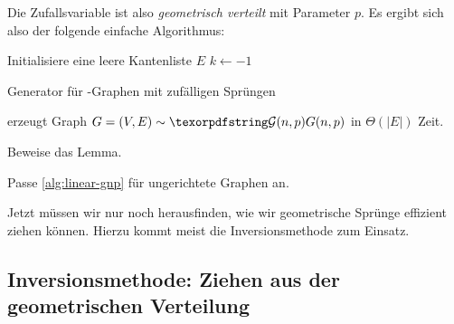 \noindent Die Zufallsvariable ist also \emph{geometrisch verteilt} mit Parameter $p$.
Es ergibt sich also der folgende einfache Algorithmus:

\begin{algorithm}[H]
    Initialisiere eine leere Kantenliste $E$\;
    $k \gets -1$\;
    \caption{Generator für \Gnp-Graphen mit zufälligen Sprüngen}
    \label{alg:linear-gnp}
\end{algorithm}

\begin{lemma}
    \label{lem:linear-gnp}
     erzeugt Graph $G = (V, E) \follows \Gnp$ in $\Theta(|E|)$ Zeit.
\end{lemma}

\begin{exercise}
    Beweise das Lemma.
\end{exercise}
\begin{exercise}
    Passe \cref{alg:linear-gnp} für ungerichtete Graphen an.
\end{exercise}

Jetzt müssen wir nur noch herausfinden, wie wir geometrische Sprünge effizient ziehen können.
Hierzu kommt meist die Inversionsmethode zum Einsatz.

\subsection{Inversionsmethode: Ziehen aus der geometrischen Verteilung}
\label{sec:inversionsmethode}

